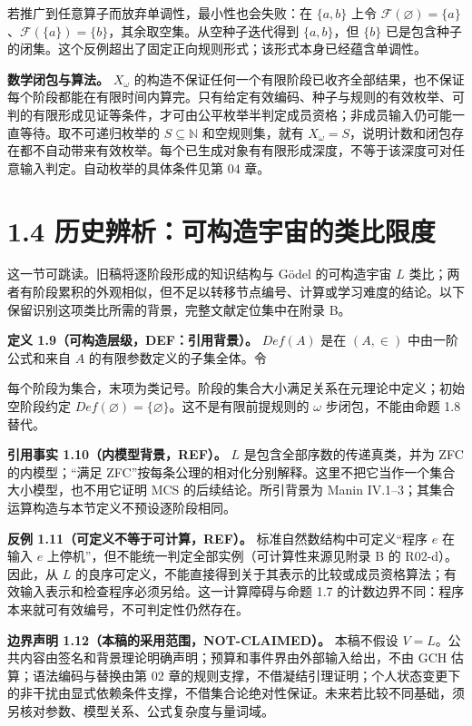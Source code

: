 \documentclass[UTF8,a4paper,zihao=-4,fontset=windows,openany]{ctexbook}
\newcommand{\mcsdisplay}[1]{%
  \par\addvspace{0.7em}%
  \sbox{\mcsmathbox}{\ensuremath{\displaystyle #1}}%
  \ifdim\wd\mcsmathbox>\linewidth
    \noindent\resizebox{\linewidth}{!}{\usebox{\mcsmathbox}}%
  \else
    \noindent\hspace*{\fill}\usebox{\mcsmathbox}\hspace*{\fill}%
  \fi
  \par\addvspace{0.7em}%
}
\def\ensuremath#1{#1}%
\def\text#1{#1}%
\def\operatorname#1{#1}%
\def\mathrm#1{#1}%
\begin{document}
若推广到任意算子而放弃单调性，最小性也会失败：在 \(\{a,b\}\) 上令 \(\mathcal F(\varnothing)=\{a\}\)、\(\mathcal F(\{a\})=\{b\}\)，其余取空集。从空种子迭代得到 \(\{a,b\}\)，但 \(\{b\}\) 已是包含种子的闭集。这个反例超出了固定正向规则形式；该形式本身已经蕴含单调性。

\textbf{数学闭包与算法。} \(X_\omega\) 的构造不保证任何一个有限阶段已收齐全部结果，也不保证每个阶段都能在有限时间内算完。只有给定有效编码、种子与规则的有效枚举、可判的有限形成见证等条件，才可由公平枚举半判定成员资格；非成员输入仍可能一直等待。取不可递归枚举的 \(S\subseteq\mathbb N\) 和空规则集，就有 \(X_\omega=S\)，说明计数和闭包存在都不自动带来有效枚举。每个已生成对象有有限形成深度，不等于该深度可对任意输入判定。自动枚举的具体条件见第 04 章。

\section{1.4 历史辨析：可构造宇宙的类比限度}
这一节可跳读。旧稿将逐阶段形成的知识结构与 Gödel 的可构造宇宙 \(L\) 类比；两者有阶段累积的外观相似，但不足以转移节点编号、计算或学习难度的结论。以下保留识别这项类比所需的背景，完整文献定位集中在附录 B。

\textbf{定义 1.9（可构造层级，DEF：引用背景）。} \(\operatorname{Def}(A)\) 是在 \((A,\in)\) 中由一阶公式和来自 \(A\) 的有限参数定义的子集全体。令


\mcsdisplay{L_0=\varnothing,\qquad L_{\alpha+1}=\operatorname{Def}(L_\alpha),\qquad
L_\lambda=\bigcup_{\alpha<\lambda}L_\alpha\quad(\lambda\text{ 为非零极限序数}),
\qquad L=\bigcup_{\alpha\in\mathrm{Ord}}L_\alpha.}
\noindent 每个阶段为集合，末项为类记号。阶段的集合大小满足关系在元理论中定义；初始空阶段约定 \(\operatorname{Def}(\varnothing)=\{\varnothing\}\)。这不是有限前提规则的 \(\omega\) 步闭包，不能由命题 1.8 替代。

\textbf{引用事实 1.10（内模型背景，REF）。} \(L\) 是包含全部序数的传递真类，并为 ZFC 的内模型；“满足 ZFC”按每条公理的相对化分别解释。这里不把它当作一个集合大小模型，也不用它证明 MCS 的后续结论。所引背景为 Manin IV.1–3；其集合运算构造与本节定义不预设逐阶段相同。

\textbf{反例 1.11（可定义不等于可计算，REF）。} 标准自然数结构中可定义“程序 \(e\) 在输入 \(e\) 上停机”，但不能统一判定全部实例（可计算性来源见附录 B 的 R02-d）。因此，从 \(L\) 的良序可定义，不能直接得到关于其表示的比较或成员资格算法；有效输入表示和检查程序必须另给。这一计算障碍与命题 1.7 的计数边界不同：程序本来就可有效编号，不可判定性仍然存在。

\textbf{边界声明 1.12（本稿的采用范围，NOT-CLAIMED）。} 本稿不假设 \(V=L\)。公共内容由签名和背景理论明确声明；预算和事件界由外部输入给出，不由 GCH 估算；语法编码与替换由第 02 章的规则支撑，不借凝结引理证明；个人状态变更下的非干扰由显式依赖条件支撑，不借集合论绝对性保证。未来若比较不同基础，须另核对参数、模型关系、公式复杂度与量词域。
\end{document}
